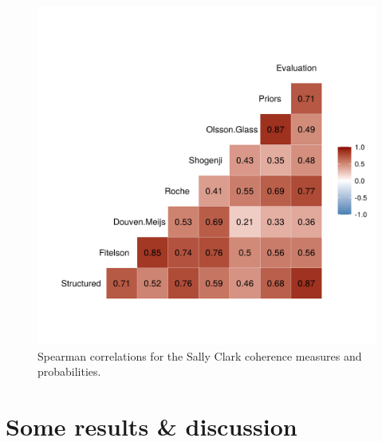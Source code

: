 \documentclass[10pt,]{scrartcl}
\begin{document}
\begin{figure}[H]
    \includegraphics{../images/scSpearman.png}
    \caption{Spearman correlations for the Sally Clark coherence measures and probabilities.}
    \label{fig:spearman}
\end{figure}






\section{Some results \& discussion}\label{sec:discussion}
\end{document}
